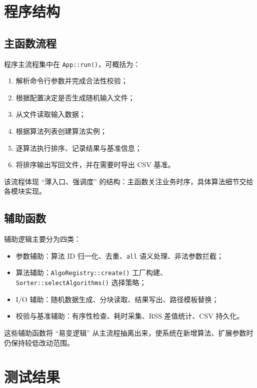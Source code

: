 \documentclass[12pt, a4paper]{ctexart}
\begin{document}
\section{程序结构}

\subsection{主函数流程}

程序主流程集中在 \texttt{App::run()}，可概括为：

\begin{enumerate}
    \item 解析命令行参数并完成合法性校验；
    \item 根据配置决定是否生成随机输入文件；
    \item 从文件读取输入数据；
    \item 根据算法列表创建算法实例；
    \item 逐算法执行排序、记录结果与基准信息；
    \item 将排序输出写回文件，并在需要时导出 CSV 基准。
\end{enumerate}

该流程体现 ``薄入口、强调度'' 的结构：主函数关注业务时序，具体算法细节交给各模块实现。

\subsection{辅助函数}

辅助逻辑主要分为四类：

\begin{itemize}
    \item 参数辅助：算法 ID 归一化、去重、\texttt{all} 语义处理、非法参数拦截；
    \item 算法辅助：\texttt{AlgoRegistry::create()} 工厂构建、\texttt{Sorter::selectAlgorithms()} 选择策略；
    \item I/O 辅助：随机数据生成、分块读取、结果写出、路径模板替换；
    \item 校验与基准辅助：有序性检查、耗时采集、RSS 差值统计、CSV 持久化。
\end{itemize}

这些辅助函数将 ``易变逻辑'' 从主流程抽离出来，使系统在新增算法、扩展参数时仍保持较低改动范围。

\section{测试结果}
\end{document}
